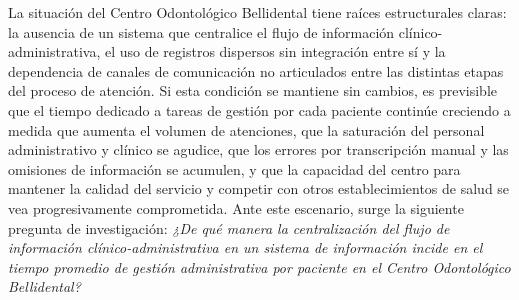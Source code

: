 La situación del Centro Odontológico Bellidental tiene raíces estructurales claras: la ausencia de un sistema que centralice el flujo de información clínico-administrativa, el uso de registros dispersos sin integración entre sí y la dependencia de canales de comunicación no articulados entre las distintas etapas del proceso de atención. Si esta condición se mantiene sin cambios, es previsible que el tiempo dedicado a tareas de gestión por cada paciente continúe creciendo a medida que aumenta el volumen de atenciones, que la saturación del personal administrativo y clínico se agudice, que los errores por transcripción manual y las omisiones de información se acumulen, y que la capacidad del centro para mantener la calidad del servicio y competir con otros establecimientos de salud se vea progresivamente comprometida. Ante este escenario, surge la siguiente pregunta de investigación: \textit{¿De qué manera la centralización del flujo de información clínico-administrativa en un sistema de información incide en el tiempo promedio de gestión administrativa por paciente en el Centro Odontológico Bellidental?}